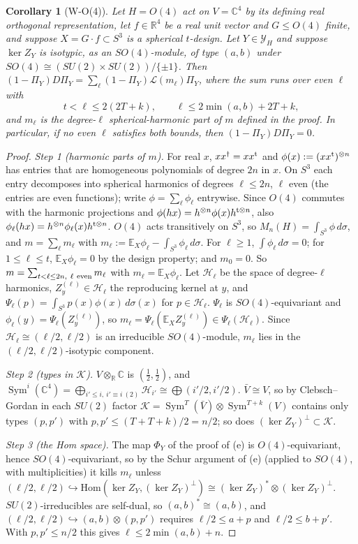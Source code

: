 \documentclass[11pt]{article}
\newcommand{\C}{\mathbb{C}}
\newcommand{\E}{\mathbb{E}}
\newcommand{\Sym}{\operatorname{Sym}}
\newtheorem{corollary}[theorem]{Corollary}
\theoremstyle{definition}
\theoremstyle{remark}
\begin{document}
\begin{corollary}[W-O(4)]\label{cor:WO4}
Let $H=O(4)$ act on $V=\C^4$ by its defining real orthogonal representation, let $f\in\mathbb{R}^4$ be a real unit vector and $G\le O(4)$ finite,
and suppose $X=G\cdot f\subset S^3$ is a spherical $t$-design. Let $Y\in\mathcal Y_H$ and suppose $\ker Z_Y$ is isotypic, as an
$SO(4)$-module, of type $(a,b)$ under $SO(4)\cong(SU(2)\times SU(2))/\{\pm1\}$. Then $(1-\Pi_Y)D\Pi_Y=\sum_\ell(1-\Pi_Y)\mathcal L(m_\ell)\Pi_Y$,
where the sum runs over even $\ell$ with
\[
t<\ell\le2(2T+k),\qquad\ell\le2\min(a,b)+2T+k,
\]
and $m_\ell$ is the degree-$\ell$ spherical-harmonic part of $m$ defined in the proof. In particular, if no even $\ell$ satisfies both
bounds, then $(1-\Pi_Y)D\Pi_Y=0$.
\end{corollary}
\begin{proof}
\emph{Step 1 (harmonic parts of $m$).} For real $x$, $xx^\dagger=xx^{\rm t}$ and $\phi(x):=(xx^{\rm t})^{\otimes n}$ has entries that are
homogeneous polynomials of degree $2n$ in $x$. On $S^3$ each entry decomposes into spherical harmonics of degrees $\ell\le2n$, $\ell$ even
(the entries are even functions); write $\phi=\sum_\ell\phi_\ell$ entrywise. Since $O(4)$ commutes with the harmonic projections and
$\phi(hx)=h^{\otimes n}\phi(x)h^{{\rm t}\otimes n}$, also $\phi_\ell(hx)=h^{\otimes n}\phi_\ell(x)h^{{\rm t}\otimes n}$. $O(4)$ acts
transitively on $S^3$, so $M_n(H)=\int_{S^3}\phi\,d\sigma$, and $m=\sum_\ell m_\ell$ with
$m_\ell:=\E_X\phi_\ell-\int_{S^3}\phi_\ell\,d\sigma$. For $\ell\ge1$, $\int\phi_\ell\,d\sigma=0$; for $1\le\ell\le t$, $\E_X\phi_\ell=0$
by the design property; and $m_0=0$. So $m=\sum_{t<\ell\le2n,\ \ell\ \rm even}m_\ell$ with $m_\ell=\E_X\phi_\ell$. Let
$\mathcal H_\ell$ be the space of degree-$\ell$ harmonics, $Z^{(\ell)}_y\in\mathcal H_\ell$ the reproducing kernel at $y$, and
$\Psi_\ell(p)=\int_{S^3}p(x)\phi(x)\,d\sigma(x)$ for $p\in\mathcal H_\ell$. $\Psi_\ell$ is $SO(4)$-equivariant and
$\phi_\ell(y)=\Psi_\ell(Z^{(\ell)}_y)$, so $m_\ell=\Psi_\ell(\E_XZ^{(\ell)}_y)\in\Psi_\ell(\mathcal H_\ell)$. Since
$\mathcal H_\ell\cong(\ell/2,\ell/2)$ is an irreducible $SO(4)$-module, $m_\ell$ lies in the $(\ell/2,\ell/2)$-isotypic component.

\emph{Step 2 (types in $\mathcal K$).} $V\otimes_{\mathbb R}\C$ is $(\tfrac12,\tfrac12)$, and $\Sym^i(\C^4)=\bigoplus_{i'\le i,\ i'\equiv i\ (2)}\mathcal H_{i'}\cong
\bigoplus(i'/2,i'/2)$. $\bar V\cong V$, so by Clebsch--Gordan in each $SU(2)$ factor $\mathcal K=\Sym^T(\bar V)\otimes\Sym^{T+k}(V)$ contains only
types $(p,p')$ with $p,p'\le(T+T+k)/2=n/2$; so does $(\ker Z_Y)^\perp\subset\mathcal K$.

\emph{Step 3 (the Hom space).} The map $\Phi_Y$ of the proof of (e) is $O(4)$-equivariant, hence $SO(4)$-equivariant, so by the Schur argument
of (e) (applied to $SO(4)$, with multiplicities) it kills $m_\ell$ unless $(\ell/2,\ell/2)\hookrightarrow\mathrm{Hom}(\ker Z_Y,(\ker Z_Y)^\perp)\cong(\ker Z_Y)^*\otimes(\ker Z_Y)^\perp$.
$SU(2)$-irreducibles are self-dual, so $(a,b)^*\cong(a,b)$, and $(\ell/2,\ell/2)\hookrightarrow(a,b)\otimes(p,p')$ requires
$\ell/2\le a+p$ and $\ell/2\le b+p'$. With $p,p'\le n/2$ this gives $\ell\le2\min(a,b)+n$.
\end{proof}
\end{document}
